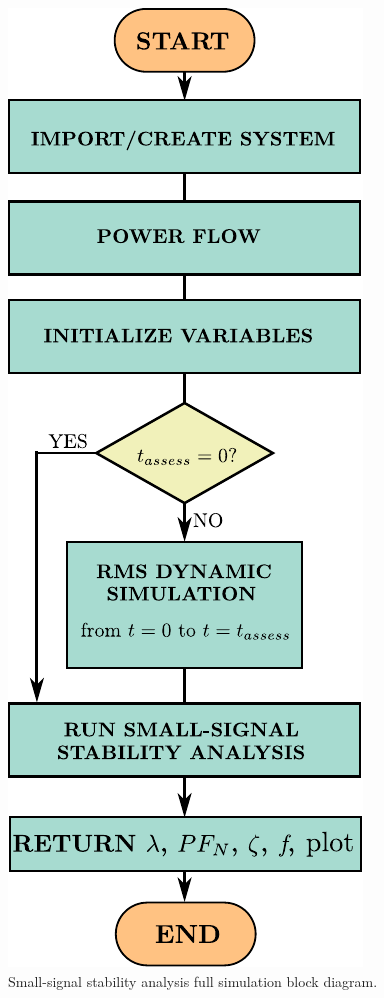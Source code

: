 \begin{figure}[h]
  \centering
  \includegraphics[width=0.35\linewidth]{inkscape_svg/block_diagram_full_code_smallsignal.pdf}
  \caption{Small-signal stability analysis full simulation block diagram.}
  \label{fig:block_diagram_full_smallsignal}
\end{figure}


